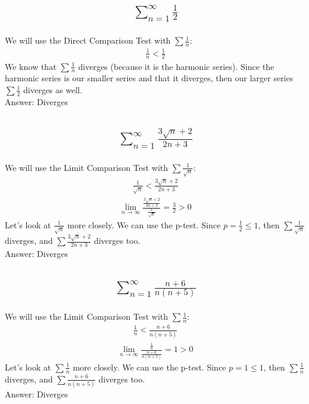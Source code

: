 \documentclass{article}
\begin{document}
\subsection{
	\begin{align*}
		\sum_{n = 1}^\infty \frac{1}{2}
	\end{align*}
}
We will use the Direct Comparison Test with $\sum \frac{1}{n}$:
\begin{align*}
	\frac{1}{n} < \frac{1}{2}
\end{align*}
We know that $\sum \frac{1}{n}$ diverges (because it is the harmonic series). Since the harmonic series is our smaller series and that it diverges, then our larger series $\sum \frac{1}{2}$ diverges as well. \\[10pt]
Answer: Diverges

\subsection{
	\begin{align*}
		\sum_{n = 1}^\infty \frac{3 \sqrt{n} + 2}{2n + 3}
	\end{align*}
}
We will use the Limit Comparison Test with $\sum \frac{1}{\sqrt{n}}$:
\begin{align*}
	\frac{1}{\sqrt{n}} < \frac{3 \sqrt{n} + 2}{2n + 3}
\end{align*}
\begin{align*}
	\lim_{n \to \infty} {\frac{\frac{3 \sqrt{n} + 2}{2n + 3}}{\frac{1}{\sqrt{n}}}} = \frac{3}{2} > 0
\end{align*}
Let's look at $\frac{1}{\sqrt{n}}$ more closely. We can use the p-test. Since $p = \frac{1}{2} \leq 1$, then $ \sum \frac{1}{\sqrt{n}}$ diverges, and $\sum \frac{3 \sqrt{n} + 2}{2n + 3}$ diverges too. \\[10pt]
Answer: Diverges

\subsection{
	\begin{align*}
		\sum_{n = 1}^\infty \frac{n + 6}{n(n + 5)}
	\end{align*}
}
We will use the Limit Comparison Test with $\sum \frac{1}{n}$:
\begin{align*}
	\frac{1}{n} < \frac{n + 6}{n(n + 5)}
\end{align*}
\begin{align*}
	\lim_{n \to \infty} {\frac{\frac{1}{n}}{\frac{n + 6}{n(n + 5)}}} = 1 > 0
\end{align*}
Let's look at $\sum \frac{1}{n}$ more closely. We can use the p-test. Since $p = 1 \leq 1$, then $\sum \frac{1}{n}$ diverges, and $\sum \frac{n + 6}{n(n + 5)}$ diverges too. \\[10pt]
Answer: Diverges
\end{document}
